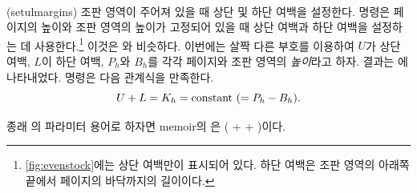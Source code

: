 \begin{syntax}
\cmd{\setulmargins} \\
\end{syntax}
\glossary(setulmargins)%
  {}%
  {조판 영역이 주어져 있을 때 상단 및 하단 여백을 설정한다.}
\cmd{\setulmargins} 명령은 페이지의 높이와 조판 영역의 높이가 고정되어 있을 때
상단 여백과 하단 여백을 설정하는 데 사용한다.\footnote{\과
\ref{fig:evenstock}에는 상단 여백만이 표시되어 있다. 하단 여백은 조판 영역의
아래쪽 끝에서 페이지의 바닥까지의 길이이다.}
이것은 \cmd{\setlrmargins}와 비슷하다. 이번에는 살짝 다른 부호를 이용하여
$U$가 상단 여백, $L$이 하단 여백, $P_h$와 $B_h$를 각각 페이지와 조판 영역의 \emph{높이}라고 하자. 결과는 에 나타내었다.
\cmd{\setulmargins} 명령은 다음 관계식을 만족한다.
\begin{displaymath}
U + L = K_{h}  = \textrm{constant} \mbox{\space} (= P_{h} - B_{h}).
\end{displaymath}

종래 \ltx 의 파라미터 용어로 하자면 memoir의 \lnc{\uppermargin}은 
(\lnc{\topmargin} + \lnc{\headheight} + \lnc{\headsep})이다.

